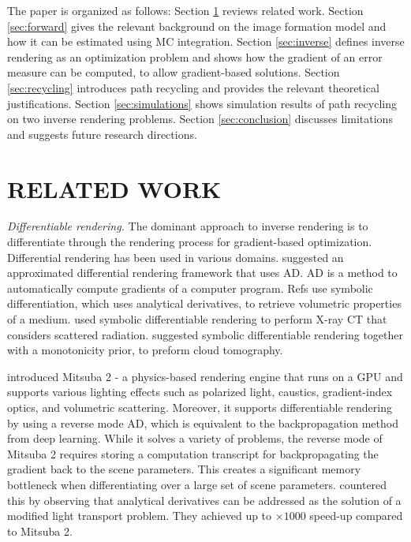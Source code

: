 \documentclass{article}
\begin{document}
The paper is organized as follows: Section \ref{sec:related} reviews related work. Section \ref{sec:forward} gives the relevant background on the image formation model and how it can be estimated using \ac{MC} integration. Section \ref{sec:inverse} defines inverse rendering as an optimization problem and shows how the gradient of an error measure can be computed, to allow gradient-based solutions. Section \ref{sec:recycling} introduces path recycling and provides the relevant theoretical justifications. Section \ref{sec:simulations} shows simulation results of path recycling on two inverse rendering problems. Section \ref{sec:conclusion} discusses limitations and suggests future research directions.

\section{RELATED WORK}
\label{sec:related}
{\em Differentiable rendering.} The dominant approach to inverse rendering is to differentiate through the rendering process for gradient-based optimization.  Differential rendering has been used in various domains. \citep{loper2014opendr} suggested an approximated differential rendering framework that uses \ac{AD}. \ac{AD} is a method to automatically compute gradients of a computer program. Refs \citep{gkioulekas2013inverse, gkioulekas2016evaluation} use symbolic differentiation, which uses analytical derivatives, to retrieve volumetric properties of a medium. \citep{geva2018x}  used symbolic differentiable rendering to perform X-ray \ac{CT} that considers scattered radiation. \citep{loeub2020monotonicity} suggested symbolic differentiable rendering together with a monotonicity prior, to preform cloud tomography.

\citep{nimier2019mitsuba} introduced Mitsuba 2 - a physics-based rendering engine that runs on a \ac{GPU} and supports various lighting effects such as polarized light, caustics, gradient-index optics, and volumetric scattering. Moreover, it supports differentiable rendering by using a reverse mode \ac{AD}, which is equivalent to the backpropagation method from deep learning. While it solves a variety of problems, the reverse mode of Mitsuba 2 requires storing a computation transcript for backpropagating the gradient back to the scene parameters. This creates a significant memory bottleneck when differentiating over a large set of scene parameters. \citep{nimier2020radiative} countered this by observing that analytical derivatives can be addressed as the solution of a modified light transport problem. They achieved up to $\times1000$ speed-up compared to Mitsuba 2. 
\end{document}
